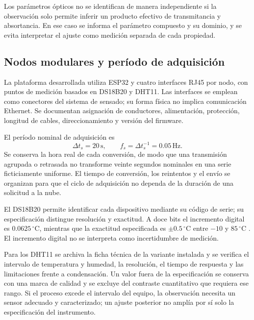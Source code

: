 Los parámetros ópticos no se identifican de manera independiente si la observación solo permite inferir un producto efectivo de transmitancia y absortancia. En ese caso se informa el parámetro compuesto y su dominio, y se evita interpretar el ajuste como medición separada de cada propiedad.


\subsection{Nodos modulares y período de adquisición}

La plataforma desarrollada utiliza ESP32 y cuatro interfaces RJ45 por nodo, con puntos de medición basados en DS18B20 y DHT11. Las interfaces se emplean como conectores del sistema de sensado; su forma física no implica comunicación Ethernet. Se documentan asignación de conductores, alimentación, protección, longitud de cables, direccionamiento y versión del firmware.

El período nominal de adquisición es
\begin{equation}
\Delta t_s=20\,\mathrm s,
\qquad
f_s=\Delta t_s^{-1}=0.05\,\mathrm{Hz}.
\label{met:muestreo}
\end{equation}
Se conserva la hora real de cada conversión, de modo que una transmisión agrupada o retrasada no transforme veinte segundos nominales en una serie ficticiamente uniforme. El tiempo de conversión, los reintentos y el envío se organizan para que el ciclo de adquisición no dependa de la duración de una solicitud a la nube.

El DS18B20 permite identificar cada dispositivo mediante su código de serie; su especificación distingue resolución y exactitud. A doce bits el incremento digital es $0.0625\,^{\circ}\mathrm C$, mientras que la exactitud especificada es $\pm0.5\,^{\circ}\mathrm C$ entre $-10$ y $85\,^{\circ}\mathrm C$ \cite{ds18b20_2019}. El incremento digital no se interpreta como incertidumbre de medición.

Para los DHT11 se archiva la ficha técnica de la variante instalada y se verifica el intervalo de temperatura y humedad, la resolución, el tiempo de respuesta y las limitaciones frente a condensación. Un valor fuera de la especificación se conserva con una marca de calidad y se excluye del contraste cuantitativo que requiera ese rango. Si el proceso excede el intervalo del equipo, la observación necesita un sensor adecuado y caracterizado; un ajuste posterior no amplía por sí solo la especificación del instrumento.

